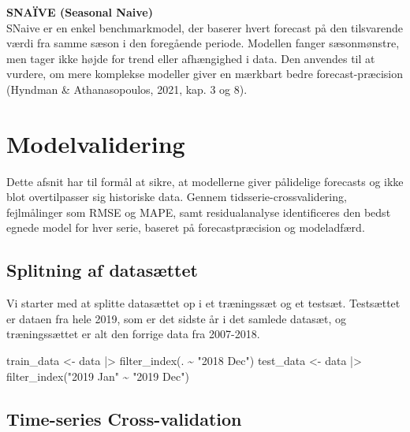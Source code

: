 \documentclass[
]{article}
\newenvironment{Shaded}{\begin{snugshade}}{\end{snugshade}}
\newcommand{\FunctionTok}[1]{\textcolor[rgb]{0.28,0.35,0.67}{#1}}
\newcommand{\NormalTok}[1]{\textcolor[rgb]{0.00,0.23,0.31}{#1}}
\newcommand{\OtherTok}[1]{\textcolor[rgb]{0.00,0.23,0.31}{#1}}
\newcommand{\SpecialCharTok}[1]{\textcolor[rgb]{0.37,0.37,0.37}{#1}}
\newcommand{\StringTok}[1]{\textcolor[rgb]{0.13,0.47,0.30}{#1}}
\begin{document}
\textbf{SNAÏVE (Seasonal Naive)}\\
SNaive er en enkel benchmarkmodel, der baserer hvert forecast på den
tilsvarende værdi fra samme sæson i den foregående periode. Modellen
fanger sæsonmønstre, men tager ikke højde for trend eller afhængighed i
data. Den anvendes til at vurdere, om mere komplekse modeller giver en
mærkbart bedre forecast-præcision (Hyndman \& Athanasopoulos, 2021, kap.
3 og 8).

\section{Modelvalidering}\label{modelvalidering}

Dette afsnit har til formål at sikre, at modellerne giver pålidelige
forecasts og ikke blot overtilpasser sig historiske data. Gennem
tidsserie-crossvalidering, fejlmålinger som RMSE og MAPE, samt
residualanalyse identificeres den bedst egnede model for hver serie,
baseret på forecastpræcision og modeladfærd.

\subsection{Splitning af datasættet}\label{splitning-af-datasuxe6ttet}

Vi starter med at splitte datasættet op i et træningssæt og et testsæt.
Testsættet er dataen fra hele 2019, som er det sidste år i det samlede
datasæt, og træningssættet er alt den forrige data fra 2007-2018.

\begin{Shaded}
\begin{Highlighting}[]
\NormalTok{train\_data }\OtherTok{\textless{}{-}}\NormalTok{ data }\SpecialCharTok{|\textgreater{}} \FunctionTok{filter\_index}\NormalTok{(. }\SpecialCharTok{\textasciitilde{}} \StringTok{"2018 Dec"}\NormalTok{)}
\NormalTok{test\_data  }\OtherTok{\textless{}{-}}\NormalTok{ data }\SpecialCharTok{|\textgreater{}} \FunctionTok{filter\_index}\NormalTok{(}\StringTok{"2019 Jan"} \SpecialCharTok{\textasciitilde{}} \StringTok{"2019 Dec"}\NormalTok{)}
\end{Highlighting}
\end{Shaded}

\subsection{Time-series
Cross-validation}\label{time-series-cross-validation}
\end{document}
